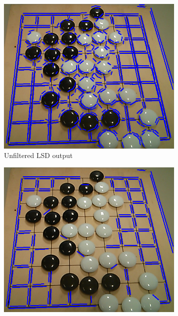 	\begin{figure}
	\begin{center}
		\begin{subfigure}{0.33\textwidth}
			\includegraphics[width=\textwidth]{images/lsd_first.png}
			\caption{Unfiltered LSD output}
			\label{fig:lsdPostprocessingFirst}
		\end{subfigure}
		\hspace{2em}
		\begin{subfigure}{0.33\textwidth}
			\includegraphics[width=\textwidth]{images/lsd_length.png}

\end{subfigure}
\end{center}
\end{figure}
